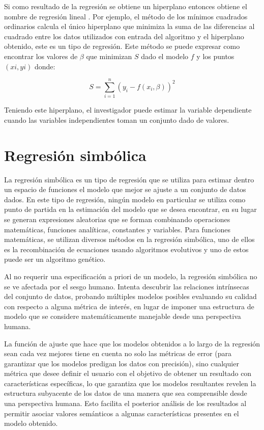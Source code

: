 Si como resultado de la regresión se obtiene un hiperplano entonces obtiene el nombre de regresión lineal \cite{mann2007introductory}. Por ejemplo, el método de los mínimos cuadrados ordinarios calcula el único hiperplano que minimiza la suma de las diferencias al cuadrado entre los datos utilizados con entrada del algoritmo y el hiperplano obtenido, este es un tipo de regresión. Este método se puede expresar como encontrar los valores de $\beta$ que minimizan $S$ dado el modelo $f$ y los puntos $(xi, yi)$ donde:

$$S = \sum_{i=1}^{n}(y_i - f(x_i, \beta))^2$$

Teniendo este hiperplano, el investigador puede estimar la variable dependiente cuando las variables independientes toman un conjunto dado de valores.

\section{Regresión simbólica}

La regresión simbólica es un tipo de regresión que se utiliza para estimar dentro un espacio de funciones el modelo que mejor se ajuste a un conjunto de datos dados. En este tipo de regresión, ningún modelo en particular se utiliza como punto de partida en la estimación del modelo que se desea encontrar, en su lugar se generan expresiones aleatorias que se forman combinando operaciones matemáticas, funciones analíticas, constantes y variables. Para funciones matemáticas, se utilizan diversos métodos en la regresión simbólica, uno de ellos es la recombinación de ecuaciones usando algoritmos evolutivos y uno de estos puede ser un algoritmo genético.

Al no requerir una especificación a priori de un modelo, la regresión simbólica no se ve afectada por el sesgo humano. Intenta descubrir las relaciones intrínsecas del conjunto de datos, probando múltiples modelos posibles evaluando su calidad con respecto a alguna métrica de interés, en lugar de imponer una estructura de modelo que se considere matemáticamente manejable desde una perspectiva humana.

La función de ajuste que hace que los modelos obtenidos a lo largo de la regresión sean cada vez mejores tiene en cuenta no solo las métricas de error (para garantizar que los modelos predigan los datos con precisión), sino cualquier métrica que desee definir el usuario con el objetivo de obtener un resultado con características específicas, lo que garantiza que los modelos resultantes revelen la estructura subyacente de los datos de una manera que sea comprensible desde una perspectiva humana. Esto facilita el posterior análisis de los resultados al permitir asociar valores semánticos a algunas características presentes en el modelo obtenido.

